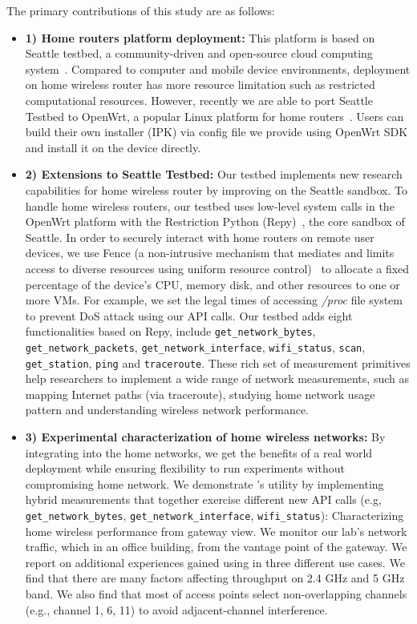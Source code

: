 The primary contributions of this study are as follows:
{\raggedright
\begin{itemize}
\item\textbf{1) Home routers platform deployment:} This platform is based on Seattle testbed, a community-driven and open-source cloud computing system~\cite{zhuang2013experience,cappos2009seattle}. Compared to computer and mobile device environments, deployment on home wireless router has more resource limitation such as restricted computational resources. However, recently we are able to port Seattle Testbed to OpenWrt, a popular Linux platform for home routers~\cite{openwrt}. Users can build their own \sysname installer (IPK) via config file we provide using OpenWrt SDK and install it on the device directly. 

\item\textbf{2) Extensions to Seattle Testbed:} Our testbed implements new research capabilities for home wireless router by improving on the Seattle sandbox. To handle home wireless routers, our testbed uses low-level system calls in the OpenWrt platform with the Restriction Python (Repy)~\cite{cappos2010retaining}, the core sandbox of Seattle. In order to securely interact with home routers on remote user devices, we use Fence (a non-intrusive mechanism that mediates and limits access to diverse resources using uniform resource control)~\cite{li2015fence} to allocate a fixed percentage of the device's CPU, memory disk, and other resources to one or more VMs. For example, we set the legal times of accessing \emph{/proc} file system to prevent DoS attack using our API calls. Our testbed adds eight functionalities based on Repy, include \texttt{get\_network\_bytes}, \texttt{get\_network\_packets}, \texttt{get\_network\_interface}, \texttt{wifi\_status}, \texttt{scan}, \texttt{get\_station}, \texttt{ping} and \texttt{traceroute}. These rich set of measurement primitives help researchers to implement a wide range of network measurements, such as mapping Internet paths (via traceroute), studying home network usage pattern and understanding wireless network performance.

\item\textbf{3) Experimental characterization of home wireless networks:} By integrating \sysname into the home networks, we get the benefits of a real world deployment while ensuring flexibility to run experiments without compromising home network. We demonstrate \sysname's utility by implementing hybrid measurements that together exercise different new API calls (e.g, \texttt{get\_network\_bytes}, \texttt{get\_network\_interface}, \texttt{wifi\_status}): Characterizing home wireless performance from gateway view. We monitor our lab's network traffic, which in an office building, from the vantage point of the gateway. We report on additional experiences gained using \sysname in three different use cases. We find that there are many factors affecting throughput on 2.4 GHz and 5 GHz band. We also find that most of access points select non-overlapping channels (e.g., channel 1, 6, 11) to avoid adjacent-channel interference. 
\end{itemize}
\par}
